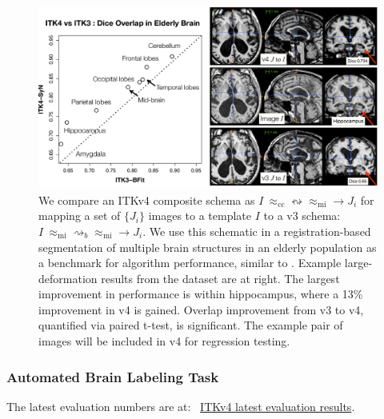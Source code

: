 \documentclass{frontiersSCNS}
\begin{document}
\begin{figure}[t]
\begin{center}
\includegraphics[width=4.5in]{figs/eval.pdf}
\caption{We compare an ITKv4 composite schema as $I
~\approx_\text{cc}  \leftrightsquigarrow \approx_\text{mi}  \rightarrow
J_i $ for mapping a set of $\{ J_i \}$ images
to a template $I$ to a v3 schema:  $I
~\approx_\text{mi} \rightsquigarrow_b    \approx_\text{mi}  \rightarrow
J_i $.  We use this schematic in a registration-based
segmentation of multiple brain structures in an elderly population as a benchmark
for algorithm performance, similar to \cite{Klein2010}.  Example
large-deformation results from the dataset are at right.  The largest
improvement in performance is within hippocampus, where a 13\%
improvement in v4 is gained.  Overlap improvement from v3 to v4, quantified via
paired t-test, is significant.  The example pair of images will be
included in v4 for regression testing.}
\label{fig:eval}
\end{center}
\end{figure}

\subsubsection{Automated Brain Labeling Task}

The latest evaluation
numbers are at:
~\textcolor{blue}{\href{https://github.com/ntustison/BSplineMorphisms}{ITKv4 latest
  evaluation results}}.
\end{document}

